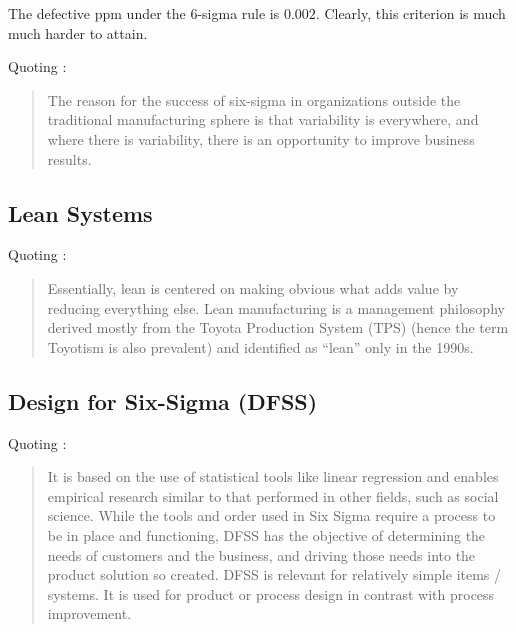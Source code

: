 \documentclass[12pt,a4paper]{report}
\begin{document}
The defective ppm under the 6-sigma rule is $0.002$. Clearly, this criterion is much much harder to attain.


Quoting \cite{montgomery_introduction_2007}: 
\begin{quote}
The reason for the success of six-sigma in organizations outside the traditional manufacturing sphere is that variability is everywhere, and where there is variability, there is an opportunity to improve business results. 
\end{quote}



\subsection{Lean Systems}
Quoting \cite{wikipedia_lean_2015}:
\begin{quote}
Essentially, lean is centered on making obvious what adds value by reducing everything else. Lean manufacturing is a management philosophy derived mostly from the Toyota Production System (TPS) (hence the term Toyotism is also prevalent) and identified as ``lean'' only in the 1990s.
\end{quote}

\subsection{Design for Six-Sigma (DFSS)}
Quoting \cite{wikipedia_design_2015}:
\begin{quote}
It is based on the use of statistical tools like linear regression and enables empirical research similar to that performed in other fields, such as social science. While the tools and order used in Six Sigma require a process to be in place and functioning, DFSS has the objective of determining the needs of customers and the business, and driving those needs into the product solution so created. DFSS is relevant for relatively simple items / systems. It is used for product or process design in contrast with process improvement.
\end{quote}
\end{document}
